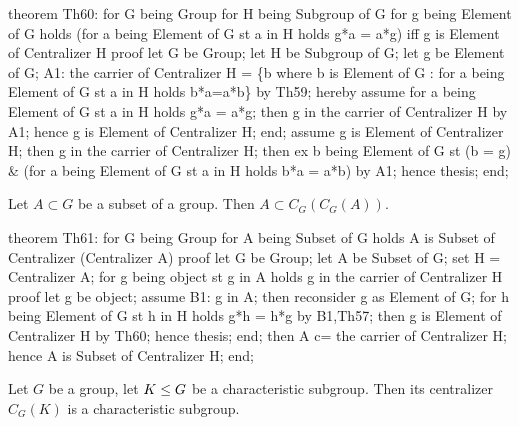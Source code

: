 \nwenddocs{}\endmoddef\nwstartdeflinemarkup{}\nwenddeflinemarkup
theorem Th60:
  for G being Group
  for H being Subgroup of G
  for g being Element of G
  holds (for a being Element of G st a in H holds g*a = a*g) iff
        g is Element of Centralizer H
proof
  let G be Group;
  let H be Subgroup of G;
  let g be Element of G;
A1: the carrier of Centralizer H = \{b where b is Element of G : for a
  being Element of G st a in H holds b*a=a*b\} by Th59;
  hereby
    assume for a being Element of G st a in H holds g*a = a*g;
    then g in the carrier of Centralizer H by A1;
    hence g is Element of Centralizer H;
  end;
  assume g is Element of Centralizer H;
  then g in the carrier of Centralizer H;
  then ex b being Element of G st (b = g) & (for a being Element of G st a in H
  holds b*a = a*b) by A1;
  hence thesis;
end;
\eatline
{}\nwendcode{}\nwdocspar
\begin{theorem}
Let $A\subset G$ be a subset of a group. Then $A\subset C_{G}(C_{G}(A))$.
\end{theorem}

\nwenddocs{}\endmoddef\nwstartdeflinemarkup{}\nwenddeflinemarkup
theorem Th61:
  for G being Group
  for A being Subset of G
  holds A is Subset of Centralizer (Centralizer A)
proof
  let G be Group;
  let A be Subset of G;
  set H = Centralizer A;
  for g being object
  st g in A
  holds g in the carrier of Centralizer H
  proof
    let g be object;
    assume B1: g in A;
    then reconsider g as Element of G;
    for h being Element of G st h in H
    holds g*h = h*g by B1,Th57;
    then g is Element of Centralizer H by Th60;
    hence thesis;
  end;
  then A c= the carrier of Centralizer H;
  hence A is Subset of Centralizer H;
end;
\eatline
{}\nwendcode{}\nwdocspar
\begin{theorem}\label{thm:characteristic:centralizer:centralizer-of-char-group-is-char}
  Let $G$ be a group, let $K\leq G$ be a characteristic subgroup.
  Then its centralizer $C_{G}(K)$ is a characteristic subgroup.
\end{theorem}

